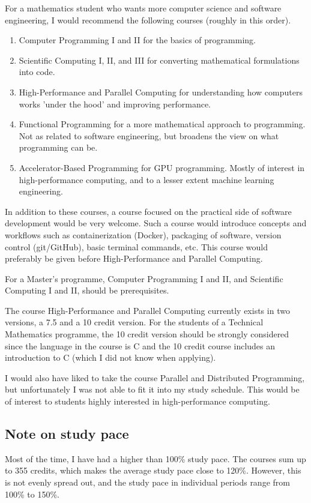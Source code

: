 \documentclass{article}
\begin{document}
  For a mathematics student who wants more computer science and software engineering, I would recommend the following courses (roughly in this order).

  \begin{enumerate}
    \item Computer Programming I and II for the basics of programming.
    \item Scientific Computing I, II, and III for converting mathematical formulations into code.
    \item High-Performance and Parallel Computing for understanding how computers works 'under the hood' and improving performance.
    \item Functional Programming for a more mathematical approach to programming. Not as related to software engineering, but broadens the view on what programming can be.
    \item Accelerator-Based Programming for GPU programming. Mostly of interest in high-performance computing, and to a lesser extent machine learning engineering.
  \end{enumerate}

  In addition to these courses, a course focused on the practical side of software development would be very welcome.
  Such a course would introduce concepts and workflows such as containerization (Docker), packaging of software, version control (git/GitHub), basic terminal commands, etc.
  This course would preferably be given before High-Performance and Parallel Computing.

  For a Master's programme, Computer Programming I and II, and Scientific Computing I and II, should be prerequisites.

  The course High-Performance and Parallel Computing currently exists in two versions, a 7.5 and a 10 credit version.
  For the students of a Technical Mathematics programme, the 10 credit version should be strongly considered since the language in the course is C and the 10 credit course includes an introduction to C (which I did not know when applying).

  I would also have liked to take the course Parallel and Distributed Programming, but unfortunately I was not able to fit it into my study schedule.
  This would be of interest to students highly interested in high-performance computing.

  \subsection{Note on study pace}
  Most of the time, I have had a higher than 100\% study pace.
  The courses sum up to 355 credits, which makes the average study pace close to 120\%.
  However, this is not evenly spread out, and the study pace in individual periods range from 100\% to 150\%.
\end{document}
